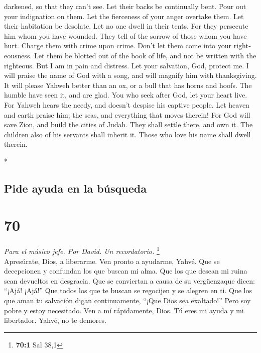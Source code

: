 \begin{paracol}{2}
\begin{otherlanguage}{english}
darkened, so that they can't see. Let their backs be continually bent.
 Pour out your indignation on them. Let the fierceness of
your anger overtake them.  Let their habitation be
desolate. Let no one dwell in their tents.  For they
persecute him whom you have wounded. They tell of the sorrow of those
whom you have hurt.  Charge them with crime upon crime.
Don't let them come into your righteousness.  Let them be
blotted out of the book of life, and not be written with the righteous.
 But I am in pain and distress. Let your salvation, God,
protect me.  I will praise the name of God with a song,
and will magnify him with thanksgiving.  It will please
Yahweh better than an ox, or a bull that has horns and hoofs.
 The humble have seen it, and are glad. You who seek
after God, let your heart live.  For Yahweh hears the
needy, and doesn't despise his captive people.  Let
heaven and earth praise him; the seas, and everything that moves
therein!  For God will save Zion, and build the cities of
Judah. They shall settle there, and own it.  The children
also of his servants shall inherit it. Those who love his name shall
dwell therein.

\end{otherlanguage}

\switchcolumn[0]*

\hypertarget{pide-ayuda-en-la-buxfasqueda}{%
\subsection{Pide ayuda en la
búsqueda}\label{pide-ayuda-en-la-buxfasqueda}}

\hypertarget{section-138}{%
\section{70}\label{section-138}}

\emph{Para el músico jefe. Por David. Un recordatorio.} \footnote{\textbf{70:1}
  Sal 38,1}\\
 Apresúrate, Dios, a liberarme. Ven pronto a ayudarme,
Yahvé.  Que se decepcionen y confundan los que buscan mi
alma. Que los que desean mi ruina sean devueltos en desgracia.
 Que se conviertan a causa de su vergüenzaque dicen:
``¡Ajá! ¡Ajá!''  Que todos los que te buscan se regocijen
y se alegren en ti. Que los que aman tu salvación digan continuamente,
``¡Que Dios sea exaltado!''  Pero soy pobre y estoy
necesitado. Ven a mí rápidamente, Dios. Tú eres mi ayuda y mi
libertador. Yahvé, no te demores.


\end{paracol}
